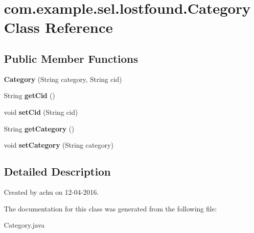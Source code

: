 \hypertarget{classcom_1_1example_1_1sel_1_1lostfound_1_1Category}{\section{com.\-example.\-sel.\-lostfound.\-Category \-Class \-Reference}
\label{classcom_1_1example_1_1sel_1_1lostfound_1_1Category}
}
\subsection*{\-Public \-Member \-Functions}
\begin{DoxyCompactItemize}
\item 
\hypertarget{classcom_1_1example_1_1sel_1_1lostfound_1_1Category_a01e1a68dd2639ab6bee0007cc1dcf294}{{\bfseries \-Category} (\-String category, \-String cid)}\label{classcom_1_1example_1_1sel_1_1lostfound_1_1Category_a01e1a68dd2639ab6bee0007cc1dcf294}

\item 
\hypertarget{classcom_1_1example_1_1sel_1_1lostfound_1_1Category_a9394ecafd86528fa00554aecbc76ebdb}{\-String {\bfseries get\-Cid} ()}\label{classcom_1_1example_1_1sel_1_1lostfound_1_1Category_a9394ecafd86528fa00554aecbc76ebdb}

\item 
\hypertarget{classcom_1_1example_1_1sel_1_1lostfound_1_1Category_ae020ac053079f77939440df880c105d7}{void {\bfseries set\-Cid} (\-String cid)}\label{classcom_1_1example_1_1sel_1_1lostfound_1_1Category_ae020ac053079f77939440df880c105d7}

\item 
\hypertarget{classcom_1_1example_1_1sel_1_1lostfound_1_1Category_aad1c1ed95ef449791e1e27725ed60314}{\-String {\bfseries get\-Category} ()}\label{classcom_1_1example_1_1sel_1_1lostfound_1_1Category_aad1c1ed95ef449791e1e27725ed60314}

\item 
\hypertarget{classcom_1_1example_1_1sel_1_1lostfound_1_1Category_a64b466d2eed1b6eafe4d2a5785aaf7e4}{void {\bfseries set\-Category} (\-String category)}\label{classcom_1_1example_1_1sel_1_1lostfound_1_1Category_a64b466d2eed1b6eafe4d2a5785aaf7e4}

\end{DoxyCompactItemize}


\subsection{\-Detailed \-Description}
\-Created by achu on 12-\/04-\/2016. 

\-The documentation for this class was generated from the following file\-:\begin{DoxyCompactItemize}
\item 
\-Category.\-java\end{DoxyCompactItemize}
